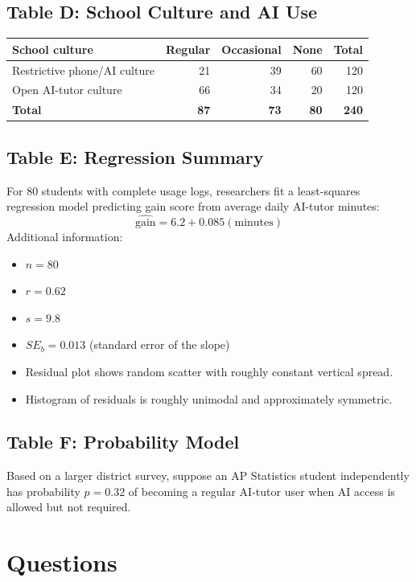 \documentclass[11pt]{article}
\begin{document}
\subsection*{Table D: School Culture and AI Use}
\begin{center}
\small
\begin{tabular}{lrrrr}
\toprule
School culture & Regular & Occasional & None & Total \\
\midrule
Restrictive phone/AI culture & 21 & 39 & 60 & 120 \\
Open AI-tutor culture        & 66 & 34 & 20 & 120 \\
\midrule
\textbf{Total}               & \textbf{87} & \textbf{73} & \textbf{80} & \textbf{240} \\
\bottomrule
\end{tabular}
\end{center}

\subsection*{Table E: Regression Summary}
For 80 students with complete usage logs, researchers fit a
least-squares regression model predicting gain score from average
daily AI-tutor minutes:
\[
\widehat{\text{gain}} = 6.2 + 0.085(\text{minutes})
\]
Additional information:
\begin{itemize}[leftmargin=*,nosep]
  \item $n = 80$
  \item $r = 0.62$
  \item $s = 9.8$
  \item $SE_b = 0.013$ (standard error of the slope)
  \item Residual plot shows random scatter with roughly constant vertical spread.
  \item Histogram of residuals is roughly unimodal and approximately symmetric.
\end{itemize}

\subsection*{Table F: Probability Model}
Based on a larger district survey, suppose an AP Statistics student
independently has probability $p = 0.32$ of becoming a regular
AI-tutor user when AI access is allowed but not required.

\section{Questions}
\end{document}
